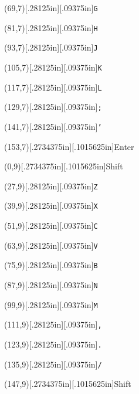 \documentclass[12pt]{{memoir}}
\newcommand\keycaps[1]{\raisebox{0in}[.2734375in][.1015625in]{\tiny\textsf{#1}}}
\newcommand\keycapt[1]{\raisebox{0in}[.28125in][.09375in]{\texttt{#1}}}
\begin{document}
\begin{center}
\begin{textblock}{12}(69,7)\keycapt{G}\end{textblock}
\begin{textblock}{12}(81,7)\keycapt{H}\end{textblock}
\begin{textblock}{12}(93,7)\keycapt{J}\end{textblock}
\begin{textblock}{12}(105,7)\keycapt{K}\end{textblock}
\begin{textblock}{12}(117,7)\keycapt{L}\end{textblock}
\begin{textblock}{12}(129,7)\keycapt{;}\end{textblock}
\begin{textblock}{12}(141,7)\keycapt{'}\end{textblock}
\begin{textblock}{27}(153,7)\keycaps{Enter}\end{textblock}
\begin{textblock}{27}(0,9)\keycaps{Shift}\end{textblock}
\begin{textblock}{12}(27,9)\keycapt{Z}\end{textblock}
\begin{textblock}{12}(39,9)\keycapt{X}\end{textblock}
\begin{textblock}{12}(51,9)\keycapt{C}\end{textblock}
\begin{textblock}{12}(63,9)\keycapt{V}\end{textblock}
\begin{textblock}{12}(75,9)\keycapt{B}\end{textblock}
\begin{textblock}{12}(87,9)\keycapt{N}\end{textblock}
\begin{textblock}{12}(99,9)\keycapt{M}\end{textblock}
\begin{textblock}{12}(111,9)\keycapt{,}\end{textblock}
\begin{textblock}{12}(123,9)\keycapt{.}\end{textblock}
\begin{textblock}{12}(135,9)\keycapt{/}\end{textblock}
\begin{textblock}{33}(147,9)\keycaps{Shift}\end{textblock}

\end{center}
\end{document}
